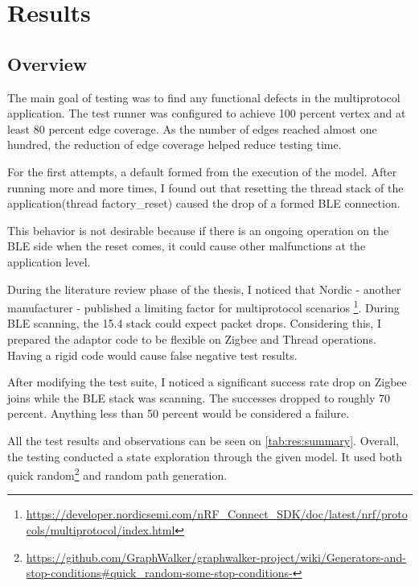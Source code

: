 \chapter{Results}
\label{chap:results}
\section{Overview}
The main goal of testing was to find any functional defects in the multiprotocol application. The test runner was configured to achieve 100 percent vertex and at least 80 percent edge coverage. As the number of edges reached almost one hundred, the reduction of edge coverage helped reduce testing time.


For the first attempts, a default formed from the execution of the model. After running more and more times, I found out that resetting the thread stack of the application(thread factory\_reset) caused the drop of a formed BLE connection.


This behavior is not desirable because if there is an ongoing operation on the BLE side when the reset comes, it could cause other malfunctions at the application level.


During the literature review phase of the thesis, I noticed that Nordic - another manufacturer - published a limiting factor for multiprotocol scenarios \footnote{\url{https://developer.nordicsemi.com/nRF_Connect_SDK/doc/latest/nrf/protocols/multiprotocol/index.html}}.
During BLE scanning, the 15.4 stack could expect packet drops.
Considering this, I prepared the adaptor code to be flexible on Zigbee and Thread operations. Having a rigid code would cause false negative test results.


After modifying the test suite, I noticed a significant success rate drop on Zigbee joins while the BLE stack was scanning.
The successes dropped to roughly 70 percent.
Anything less than 50 percent would be considered a failure.

All the test results and observations can be seen on \autoref{tab:res:summary}.
Overall, the testing conducted a state exploration through the given model.
It used both quick random\footnote{\url{https://github.com/GraphWalker/graphwalker-project/wiki/Generators-and-stop-conditions\#quick_random-some-stop-conditions-}} and random path generation.

